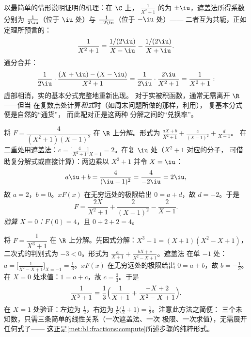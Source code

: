 \begin{example}[观察共轭配对]\label{ex:b1:fractions:pairing}
以最简单的情形说明证明的机理：在 $\C$ 上，
$\frac1{X^2+1}$ 的为 $\pm\iu$，遮盖法所得系数
分别为 $\frac1{2\iu}$（位于 $\iu$ 处）与 $\frac1{-2\iu}$（位于 $-\iu$ 处）——
二者互为共轭，正如定理所预言的：
\[
\frac{1}{X^2 + 1}
= \frac{1/(2\iu)}{X - \iu} - \frac{1/(2\iu)}{X + \iu} .
\]
通分合并：
\[
\frac{1}{2\iu}\cdot\frac{(X + \iu) - (X - \iu)}{X^2 + 1}
= \frac{1}{2\iu}\cdot\frac{2\iu}{X^2 + 1} = \frac{1}{X^2+1} :
\]
虚部相消，实的基本分式完整地重新出现。
对于实被积函数，通常无需离开 $\R$——但当
在复数点处计算\emph{和式}时（如周末问题所做的那样，利用），
复基本分式便是自然的“通货”，
而此配对正是这两种
分解之间的“兑换率”。
\end{example}

\begin{example}\label{ex:b1:fractions:real}
将 $F = \dfrac{4}{(X^2+1)(X-1)^2}$ 在 $\R$ 上分解。形式为
$\frac{aX + b}{X^2 + 1} + \frac{c}{(X-1)^2} + \frac{d}{X - 1}$。
在二重处用遮盖法：$c = \bigl[\frac{4}{X^2+1}\bigr]_{X=1} =
2$。在复 $\iu$ 处（$X^2 + 1$ 对应的分子，
可借助复分解式或直接计算）：两边乘以
$X^2 + 1$ 并令 $X = \iu$：
\[
a\iu + b = \frac{4}{(\iu - 1)^2} = \frac{4}{-2\iu} = 2\iu ,
\]
故 $a = 2$，$b = 0$。$xF(x)$ 在无穷远处的极限给出 $0 = a + d$，故 $d
= -2$。于是
\[
F = \frac{2X}{X^2+1} + \frac{2}{(X-1)^2} - \frac{2}{X-1} .
\]
\emph{验算 $X = 0$：}$F(0) = 4$，且 $0 + 2 + 2 = 4$。
\end{example}

\begin{example}[三次分母的完整计算]\label{ex:b1:fractions:cubic}
将 $F = \dfrac{1}{X^3 + 1}$ 在 $\R$ 上分解。先因式分解：$X^3 +
1 = (X + 1)(X^2 - X + 1)$，二次式的判别式为 $-3 <
0$。形式为 $\frac{a}{X+1} + \frac{bX + c}{X^2 - X + 1}$。遮盖法
在单 $-1$ 处：$a = \bigl[\frac1{X^2 - X +
1}\bigr]_{X=-1} = \frac13$。$xF(x)$ 在无穷远处的极限给出 $0 = a +
b$，故 $b = -\frac13$。在 $X = 0$ 处求值：$1 = a + c$，故 $c =
\frac23$。于是
\[
\frac{1}{X^3+1} = \frac13\Bigl(\frac{1}{X+1}
+ \frac{-X + 2}{X^2 - X + 1}\Bigr) ,
\]
在 $X = 1$ 处验证：左边为 $\frac12$，右边为
$\frac13\bigl(\frac12 + 1\bigr) = \frac12$。注意此方法之简便：
三个未知数，只需三条简单的线性关系（一次遮盖法、一次
极限、一次求值），无需展开任何式子——
这正是\cref{met:b1:fractions:compute}所述步骤的纯粹形式。
\end{example}

